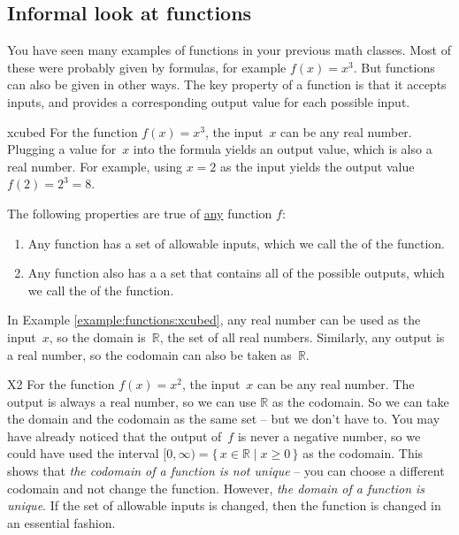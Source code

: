 \subsection{Informal look at functions}

You have seen many examples of functions in your previous math classes. 
Most of these were probably given by formulas, for example $f(x) = x^3$. 
But functions can also be given in other ways. The key property of a function
is that it accepts inputs, and provides a corresponding output value for each possible input.

\begin{example}{xcubed}
 For the function $f(x) = x^3$, the input~$x$ can be any real number.
Plugging a value for~$x$ into the formula yields an output value,
which is also a real number. For example, using $x = 2$ as the input
yields the output value $f(2) = 2^3 = 8$.
\end{example}

\medskip
The following properties are true of \underline{any} function $f$:
\begin{enumerate}
\item Any function has a  set of allowable inputs, which we call the  of the function.
\item Any function also has a a set that contains all of the
possible outputs, which we call the  of the function.
\end{enumerate}

In Example \ref{example:functions:xcubed}, any real number can be used as the input~$x$, so the domain is~$\mathbb{R}$,
the set of all real numbers. Similarly, any output is a real number, so the codomain can also be taken as~$\mathbb{R}$.

\begin{example}{X2}
 For the function $f(x) = x^2$, the input~$x$ can be any real number.
The output is always a real number, 
so we can use $\mathbb{R}$ as the codomain. So we can take the domain
and the codomain as the same set -- but we don't have to. 
You may have already noticed that the output of~$f$ is never a negative number,
so we could have used the interval $[0,\infty) = \{\, x \in \mathbb{R} \mid x \ge 0 \,\}$ as the codomain.
This shows that \emph{the codomain of a function is not unique} -- you can choose a different codomain and not change the function.
However, \emph{the domain of a function is unique}. If the set of allowable inputs is changed, then the function is changed in an essential fashion.
\end{example}

